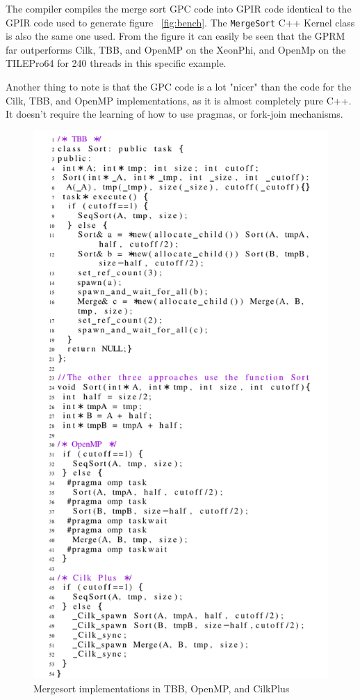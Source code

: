 The compiler compiles the merge sort GPC code into GPIR code identical to the GPIR code used to generate figure ~\ref{fig:bench}.
The \texttt{MergeSort} C++ Kernel class is also the same one used. From the figure it can easily be seen that the GPRM
far outperforms Cilk, TBB, and OpenMP on the XeonPhi, and OpenMp on the TILEPro64 for 240 threads in this specific example. 

Another thing to note is that the GPC code is a lot "nicer" than the code for the Cilk, TBB, and OpenMP
implementations, as it is almost completely pure C++.  It doesn't require the learning of how to use pragmas, 
or fork-join mechanisms.

\begin{figure}[!htb]
\includegraphics{graphs/merge.pdf}
\caption{Mergesort implementations in TBB, OpenMP, and CilkPlus \cite{GPRMBench}}
\end{figure}



